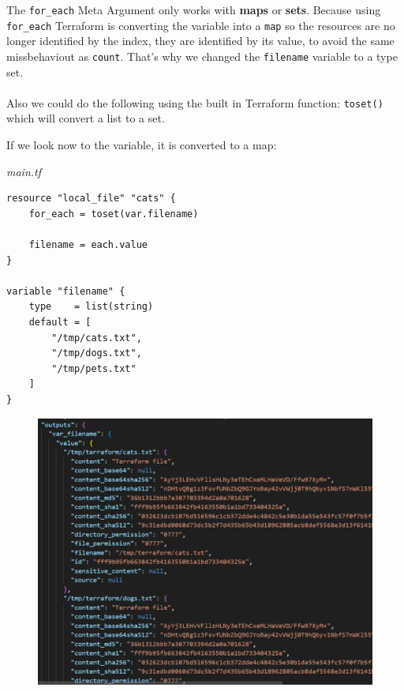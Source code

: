 \documentclass{article}
\newenvironment{blocktemplateIII}[1]{%
    \tcolorbox[beamer,%
    noparskip,breakable,
    ,colframe=Red,%
    colbacklower=LimeGreen!75!LightGreen,%
    title=#1]}%
    {\endtcolorbox}
\newenvironment{codetemplate}[1][]{%
  \mybasecolorbox[#1]
  \itshape
}{%
  \endmybasecolorbox
}
\begin{document}
\newpage
\begin{blocktemplateIII}{WARNING}
The \verb+for_each+ Meta Argument only works with \textbf{maps} or \textbf{sets}. Because using \verb+for_each+ Terraform is converting the variable into a \verb+map+ so the resources are no longer identified by the index, they are identified by its value, to avoid the same missbehaviout as \verb+count+. That's why we changed the \verb+filename+ variable to a type set.
\\\\
Also we could do the following using the built in Terraform function: \verb+toset()+ which will convert a list to a set.

If we look now to the variable, it is converted to a map:

\begin{codetemplate}{main.tf}
\begin{verbatim}
resource "local_file" "cats" {
    for_each = toset(var.filename)

    filename = each.value
}

variable "filename" {
    type    = list(string)
    default = [
        "/tmp/cats.txt",
        "/tmp/dogs.txt",
        "/tmp/pets.txt"
    ]
}
\end{verbatim}
\end{codetemplate}

\begin{figure}[H]
    \includegraphics[width=\textwidth]{pictures/pic10.png}
    \centering
\end{figure}
\end{blocktemplateIII}
\end{document}
